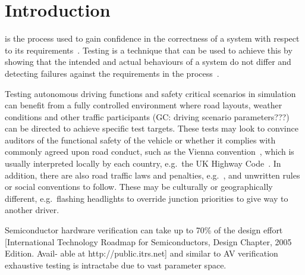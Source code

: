 \documentclass[letterpaper, 10 pt, journal, twoside]{IEEEtran}
\begin{document}
\section{Introduction}

 is the process used to gain confidence in the correctness of a system with respect to its requirements~\cite{bergeron2012writing}. Testing is a technique that can be used to achieve this by showing that the intended and actual behaviours of a system do not differ and detecting failures against the requirements in the process~\cite{utting2012taxonomy}.




Testing autonomous driving functions and safety critical scenarios in simulation can benefit from a fully controlled environment where road layouts, weather conditions and other traffic participants (GC: driving scenario parameters???) can be directed to achieve specific test targets. These tests may look to convince auditors of the functional safety of the vehicle or whether it complies with commonly agreed upon road conduct, such as the Vienna convention~\cite{ViennaConv}, which is usually interpreted locally by each country, e.g.\ the UK Highway Code~\cite{codes2011highway}. In addition, there are also road traffic laws and penalties, e.g.~\cite{RoadTraffic1988}, and unwritten rules or social conventions to follow. These may be culturally or geographically different, e.g.\ flashing headlights to override junction priorities to give way to another driver.


Semiconductor hardware verification can take up to 70\% of the design effort [International Technology Roadmap for Semiconductors, Design Chapter, 2005 Edition. Avail- able at http://public.itrs.net] and similar to AV verification exhaustive testing is intractabe due to vast parameter space.
\end{document}
